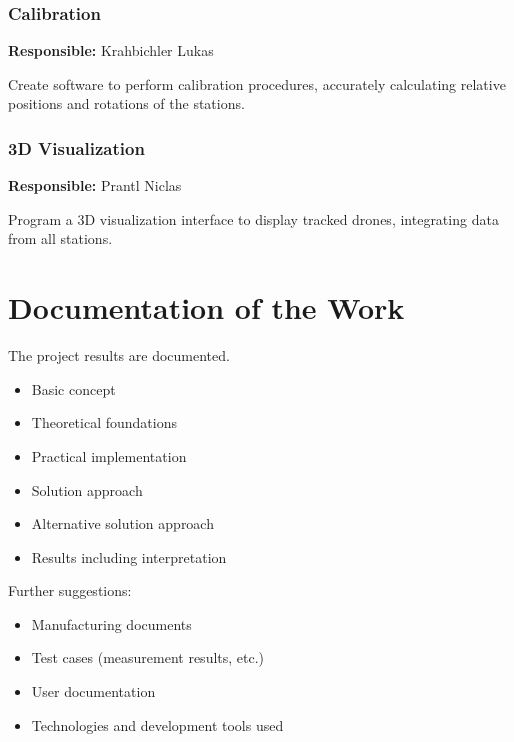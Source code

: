 \subsubsection{Calibration}

\textbf{Responsible:} Krahbichler Lukas

Create software to perform calibration procedures, accurately calculating relative positions and rotations of the stations.

\subsubsection{3D Visualization}

\textbf{Responsible:} Prantl Niclas

Program a 3D visualization interface to display tracked drones, integrating data from all stations.

\section{Documentation of the Work}

The project results are documented.

\begin{itemize}
	\item Basic concept
	\item Theoretical foundations
	\item Practical implementation
	\item Solution approach
	\item Alternative solution approach
	\item Results including interpretation
\end{itemize}

Further suggestions:

\begin{itemize}
	\item Manufacturing documents
	\item Test cases (measurement results, etc.)
	\item User documentation
	\item Technologies and development tools used
\end{itemize}
